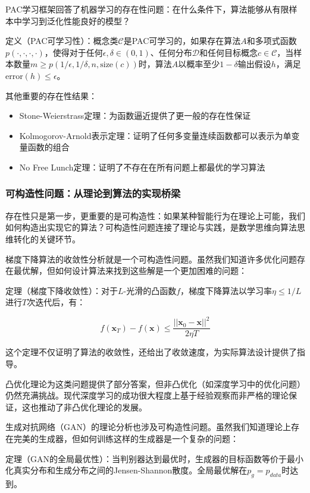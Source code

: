 PAC学习框架回答了机器学习的存在性问题：在什么条件下，算法能够从有限样本中学习到泛化性能良好的模型？

定义（PAC可学习性）：概念类$\mathcal{C}$是PAC可学习的，如果存在算法$A$和多项式函数$p(\cdot, \cdot, \cdot, \cdot)$，使得对于任何$\epsilon, \delta \in (0,1)$、任何分布$\mathcal{D}$和任何目标概念$c \in \mathcal{C}$，当样本数量$m \geq p(1/\epsilon, 1/\delta, n, \text{size}(c))$时，算法$A$以概率至少$1-\delta$输出假设$h$，满足$\text{error}(h) \leq \epsilon$。

其他重要的存在性结果：

\begin{itemize}
\item Stone-Weierstrass定理：为函数逼近提供了更一般的存在性保证
\item Kolmogorov-Arnold表示定理：证明了任何多变量连续函数都可以表示为单变量函数的组合
\item No Free Lunch定理：证明了不存在在所有问题上都最优的学习算法
\end{itemize}

\subsubsection{可构造性问题：从理论到算法的实现桥梁}

存在性只是第一步，更重要的是可构造性：如果某种智能行为在理论上可能，我们如何构造出实现它的算法？可构造性问题连接了理论与实践，是数学思维向算法思维转化的关键环节。

梯度下降算法的收敛性分析就是一个可构造性问题。虽然我们知道许多优化问题存在最优解，但如何设计算法来找到这些解是一个更加困难的问题：

定理（梯度下降收敛性）：对于$L$-光滑的凸函数$f$，梯度下降算法以学习率$\eta \leq 1/L$进行$T$次迭代后，有：

$$f(\mathbf{x}_T) - f(\mathbf{x}) \leq \frac{||\mathbf{x}_0 - \mathbf{x}||^2}{2\eta T}$$

这个定理不仅证明了算法的收敛性，还给出了收敛速度，为实际算法设计提供了指导。

凸优化理论为这类问题提供了部分答案，但非凸优化（如深度学习中的优化问题）仍然充满挑战。现代深度学习的成功很大程度上基于经验观察而非严格的理论保证，这也推动了非凸优化理论的发展。

生成对抗网络（GAN）的理论分析也涉及可构造性问题。虽然我们知道理论上存在完美的生成器，但如何训练这样的生成器是一个复杂的问题：

定理（GAN的全局最优性）：当判别器达到最优时，生成器的目标函数等价于最小化真实分布和生成分布之间的Jensen-Shannon散度。全局最优解在$p_g = p_{data}$时达到。

